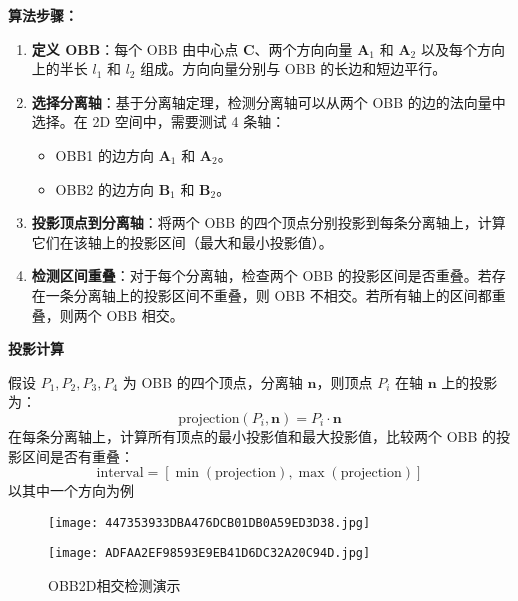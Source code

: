 \documentclass[withoutpreface,bwprint]{cumcmthesis} %
\newcommand{\tbf}[1]{\textbf{#1}}
\begin{document}
\noindent\tbf{算法步骤：}

\begin{enumerate}
    \item \textbf{定义 OBB}：每个 OBB 由中心点 $\mathbf{C}$、两个方向向量 $\mathbf{A}_1$ 和 $\mathbf{A}_2$ 以及每个方向上的半长 $l_1$ 和 $l_2$ 组成。方向向量分别与 OBB 的长边和短边平行。

    \item \textbf{选择分离轴}：基于分离轴定理，检测分离轴可以从两个 OBB 的边的法向量中选择。在 2D 空间中，需要测试 4 条轴：
    \begin{itemize}
        \item OBB1 的边方向 $\mathbf{A}_1$ 和 $\mathbf{A}_2$。
        \item OBB2 的边方向 $\mathbf{B}_1$ 和 $\mathbf{B}_2$。
    \end{itemize}

    \item \textbf{投影顶点到分离轴}：将两个 OBB 的四个顶点分别投影到每条分离轴上，计算它们在该轴上的投影区间（最大和最小投影值）。

    \item \textbf{检测区间重叠}：对于每个分离轴，检查两个 OBB 的投影区间是否重叠。若存在一条分离轴上的投影区间不重叠，则 OBB 不相交。若所有轴上的区间都重叠，则两个 OBB 相交。
\end{enumerate}

\noindent\tbf{投影计算}

假设 $P_1, P_2, P_3, P_4$ 为 OBB 的四个顶点，分离轴 $\mathbf{n}$，则顶点 $P_i$ 在轴 $\mathbf{n}$ 上的投影为：
\[
\text{projection}(P_i, \mathbf{n}) = P_i \cdot \mathbf{n}
\]
在每条分离轴上，计算所有顶点的最小投影值和最大投影值，比较两个 OBB 的投影区间是否有重叠：
\[
\text{interval} = [\min(\text{projection}), \max(\text{projection})]
\]
以其中一个方向为例

\begin{figure}[H]
    \centering
    \begin{minipage}{0.4\textwidth}
        \centering
        \texttt{[image: 447353933DBA476DCB01DB0A59ED3D38.jpg]}  
    \end{minipage}
    \hspace{0.05\textwidth}
    \begin{minipage}{0.4\textwidth}
        \centering
        \texttt{[image: ADFAA2EF98593E9EB41D6DC32A20C94D.jpg]} 
    \end{minipage}
    \caption{OBB2D相交检测演示}
\end{figure}
\end{document}
